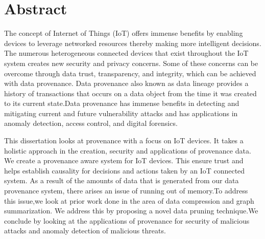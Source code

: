 

\chapter*{Abstract}
The concept of Internet of Things (IoT) offers immense benefits by
enabling devices to leverage networked resources thereby making more intelligent
decisions. The numerous heterogeneous connected devices that exist throughout
the IoT system creates new security and privacy concerns. Some of these concerns can
be overcome through data trust, transparency, and integrity, which can be
achieved with data provenance. Data provenance also known as data lineage provides a history of transactions that occurs on a data object from the time it was created to its current state.Data provenance has immense benefits in detecting and mitigating current and future vulnerability attacks and has applications in anomaly detection, access control, and digital forensics.  \par This dissertation looks at provenance with a focus on IoT devices. It takes a holistic approach in the creation, security and applications of provenance data. We create a provenance aware system for IoT devices. This ensure trust and helps establish causality for decisions and actions taken by an IoT connected system. As a result of the amounts of data that is generated from our data provenance system, there arises an issue of running out of memory.To address this issue,we look at prior work done in the area of data compression and graph summarization. We address this by proposing a novel data pruning technique.We conclude by looking at the applications of provenance for security of malicious attacks and anomaly detection of malicious threats.

